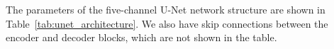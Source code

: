 \documentclass[12pt]{iopart}
\begin{document}
The parameters of the five-channel U-Net network structure are shown in Table~\ref{tab:unet_architecture}. We also have skip connections between the encoder and decoder blocks, which are not shown in the table. 
\end{document}
